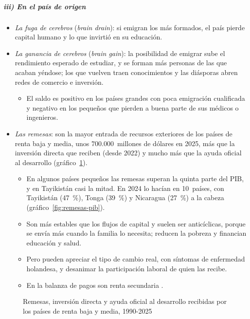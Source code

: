 \documentclass[11pt]{article}
\begin{document}
\subparagraph{iii) En el país de origen}

\begin{itemize}
\item \emph{La fuga de cerebros} (\emph{brain drain}): si emigran los más formados, el país pierde capital humano y lo que invirtió en su educación.
\item \emph{La ganancia de cerebros} (\emph{brain gain}): la posibilidad de emigrar sube el rendimiento esperado de estudiar, y se forman más personas de las que acaban yéndose; los que vuelven traen conocimientos y las diásporas abren redes de comercio e inversión.
  \begin{itemize}
  \item El saldo es positivo en los países grandes con poca emigración cualificada y negativo en los pequeños que pierden a buena parte de sus médicos o ingenieros\nocite{BeineDocquierRapoport2001,DocquierRapoport2012}.
  \end{itemize}
\item \emph{Las remesas}: son la mayor entrada de recursos exteriores de los países de renta baja y media, unos 700.000~millones de dólares en 2025, más que la inversión directa que reciben (desde 2022) y mucho más que la ayuda oficial al desarrollo (gráfico~\ref{fig:remesas-ied-aod})\nocite{BM2026WDIRemesas,FIDA2026Remesas}.
  \begin{itemize}
  \item En algunos países pequeños las remesas superan la quinta parte del PIB, y en Tayikistán casi la mitad\nocite{BM2026WDIRemesas}. En 2024 lo hacían en 10~países, con Tayikistán (47~\%), Tonga (39~\%) y Nicaragua (27~\%) a la cabeza (gráfico~\ref{fig:remesas-pib}).
  \item Son más estables que los flujos de capital y suelen ser anticíclicas, porque se envía más cuando la familia lo necesita; reducen la pobreza y financian educación y salud.
  \item Pero pueden apreciar el tipo de cambio real, con síntomas de enfermedad holandesa, y desanimar la participación laboral de quien las recibe.
  \item En la balanza de pagos son renta secundaria .
  \end{itemize}
\end{itemize}

\begin{figure}[H]
\centering
\caption{Remesas, inversión directa y ayuda oficial al desarrollo recibidas por los países de renta baja y media, 1990-2025}\label{fig:remesas-ied-aod}
\end{figure}
\end{document}
